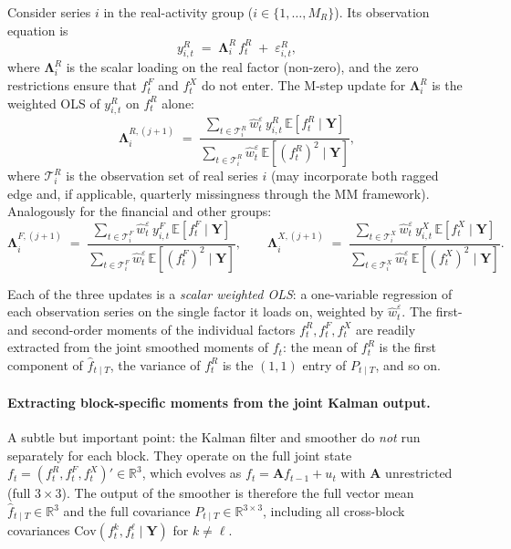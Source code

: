 \documentclass[11pt, a4paper, oneside]{article}
\newcommand{\mL}{\boldsymbol{\Lambda}}
\begin{document}
Consider series $i$ in the real-activity group ($i \in \{1, \ldots, M_R\}$).
Its observation equation is
\[
y^R_{i,t} \;=\; \mL^R_i\, f^R_t \;+\; \varepsilon^R_{i,t},
\]
where $\mL^R_i$ is the scalar loading on the real factor
(non-zero), and the zero restrictions ensure that $f^F_t$ and $f^X_t$
do not enter. The M-step update for $\mL^R_i$ is the
weighted OLS of $y^R_{i,t}$ on $f^R_t$ alone:
\begin{equation}
\mL^{R,(j+1)}_i \;=\;
\frac{\sum_{t \in \mathcal{T}^R_i} \hat{w}^\varepsilon_t\, y^R_{i,t}\, \mathbb{E}[f^R_t \mid \mathbf{Y}]}{\sum_{t \in \mathcal{T}^R_i} \hat{w}^\varepsilon_t\, \mathbb{E}[(f^R_t)^2 \mid \mathbf{Y}]},
\label{eq:block-LambdaR-update}
\end{equation}
where $\mathcal{T}^R_i$ is the observation set of real series $i$
(may incorporate both ragged edge and, if applicable, quarterly
missingness through the MM framework). Analogously for the financial
and other groups:
\begin{equation}
\mL^{F,(j+1)}_i \;=\;
\frac{\sum_{t \in \mathcal{T}^F_i} \hat{w}^\varepsilon_t\, y^F_{i,t}\, \mathbb{E}[f^F_t \mid \mathbf{Y}]}{\sum_{t \in \mathcal{T}^F_i} \hat{w}^\varepsilon_t\, \mathbb{E}[(f^F_t)^2 \mid \mathbf{Y}]},
\qquad
\mL^{X,(j+1)}_i \;=\;
\frac{\sum_{t \in \mathcal{T}^X_i} \hat{w}^\varepsilon_t\, y^X_{i,t}\, \mathbb{E}[f^X_t \mid \mathbf{Y}]}{\sum_{t \in \mathcal{T}^X_i} \hat{w}^\varepsilon_t\, \mathbb{E}[(f^X_t)^2 \mid \mathbf{Y}]}.
\label{eq:block-LambdaFX-update}
\end{equation}

Each of the three updates is a \emph{scalar weighted OLS}: a
one-variable regression of each observation series on the single
factor it loads on, weighted by $\hat{w}^\varepsilon_t$. The first- and
second-order moments of the individual factors $f^R_t, f^F_t, f^X_t$
are readily extracted from the joint smoothed moments of $f_t$: the
mean of $f^R_t$ is the first component of $\hat{f}_{t \mid T}$, the
variance of $f^R_t$ is the $(1,1)$ entry of $P_{t \mid T}$, and so on.

\paragraph{Extracting block-specific moments from the joint Kalman output.}
A subtle but important point: the Kalman filter and smoother do
\emph{not} run separately for each block. They operate on the full
joint state $f_t = (f^R_t, f^F_t, f^X_t)' \in \mathbb{R}^3$, which
evolves as $f_t = \mathbf{A} f_{t-1} + u_t$ with $\mathbf{A}$
unrestricted (full $3 \times 3$). The output of the smoother is
therefore the full vector mean $\hat{f}_{t \mid T} \in \mathbb{R}^3$
and the full covariance $P_{t \mid T} \in \mathbb{R}^{3 \times 3}$,
including all cross-block covariances
$\mathrm{Cov}(f^k_t, f^\ell_t \mid \mathbf{Y})$ for $k \neq \ell$.
\end{document}
